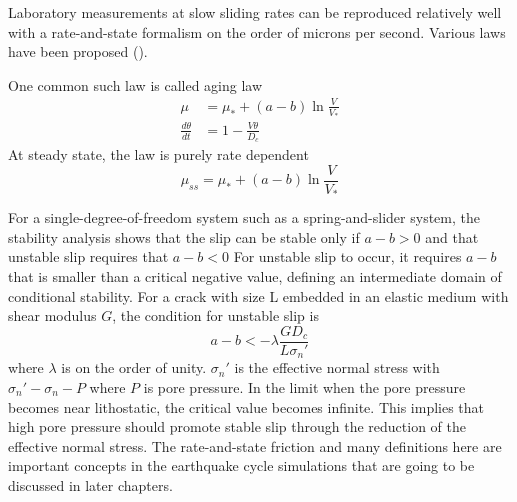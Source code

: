 Laboratory measurements at slow sliding rates can be reproduced relatively well with a rate-and-state formalism on the order of microns per second.
Various laws have been proposed (\cite{https://doi.org/10.1029/JB084iB05p02161, https://doi.org/10.1029/JB084iB05p02169,https://doi.org/10.1029/JB088iB12p10359,annurev:/content/journals/10.1146/annurev.earth.26.1.643}).

One common such law is called aging law
\begin{align}
    \mu &= \mu_* + (a - b) \ln \frac{V}{V_*} \\
    \frac{d\theta}{dt} &= 1 - \frac{V\theta}{D_c}
\end{align}
At steady state, the law is purely rate dependent
\begin{equation}
    \mu_{ss} = \mu_{*} + (a - b) \ln \frac{V}{V_*}
\end{equation}

For a single-degree-of-freedom system such as a spring-and-slider system, the stability analysis shows that the slip can be stable only if $a - b > 0$ and that unstable slip requires that $a - b < 0$  
For unstable slip to occur, it requires $a - b$ that is smaller than a critical negative value, defining an intermediate domain of conditional stability.
For a crack with size L embedded in an elastic medium with shear modulus $G$, the condition for unstable slip is 
\begin{equation}
    a - b < - \lambda \frac{GD_c}{L\sigma_n'}
\end{equation}
where $\lambda$ is on the order of unity. 
$\sigma_n'$ is the effective normal stress with $\sigma_n' - \sigma_n - P$ where $P$ is pore pressure.
In the limit when the pore pressure becomes near lithostatic, the critical value becomes infinite.
This implies that high pore pressure should promote stable slip through the reduction of the effective normal stress.
The rate-and-state friction and many definitions here are important concepts in the earthquake cycle simulations that are going to be discussed in later chapters.

\cite{}